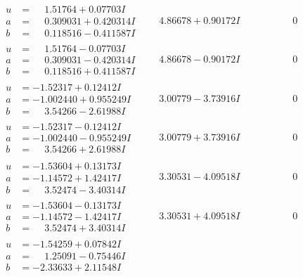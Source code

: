 \documentclass[1p]{elsarticle_modified}
\theoremstyle{definition}
\begin{document}
$$\begin{array}{c|c|c}
\begin{aligned}
u &= \phantom{-}1.51764 + 0.07703 I \\
a &= \phantom{-}0.309031 + 0.420314 I \\
b &= \phantom{-}0.118516 - 0.411587 I\end{aligned}
 & \phantom{-}4.86678 + 0.90172 I & \phantom{-0.000000 } 0 \\ \hline\begin{aligned}
u &= \phantom{-}1.51764 - 0.07703 I \\
a &= \phantom{-}0.309031 - 0.420314 I \\
b &= \phantom{-}0.118516 + 0.411587 I\end{aligned}
 & \phantom{-}4.86678 - 0.90172 I & \phantom{-0.000000 } 0 \\ \hline\begin{aligned}
u &= -1.52317 + 0.12412 I \\
a &= -1.002440 + 0.955249 I \\
b &= \phantom{-}3.54266 - 2.61988 I\end{aligned}
 & \phantom{-}3.00779 - 3.73916 I & \phantom{-0.000000 } 0 \\ \hline\begin{aligned}
u &= -1.52317 - 0.12412 I \\
a &= -1.002440 - 0.955249 I \\
b &= \phantom{-}3.54266 + 2.61988 I\end{aligned}
 & \phantom{-}3.00779 + 3.73916 I & \phantom{-0.000000 } 0 \\ \hline\begin{aligned}
u &= -1.53604 + 0.13173 I \\
a &= -1.14572 + 1.42417 I \\
b &= \phantom{-}3.52474 - 3.40314 I\end{aligned}
 & \phantom{-}3.30531 - 4.09518 I & \phantom{-0.000000 } 0 \\ \hline\begin{aligned}
u &= -1.53604 - 0.13173 I \\
a &= -1.14572 - 1.42417 I \\
b &= \phantom{-}3.52474 + 3.40314 I\end{aligned}
 & \phantom{-}3.30531 + 4.09518 I & \phantom{-0.000000 } 0 \\ \hline\begin{aligned}
u &= -1.54259 + 0.07842 I \\
a &= \phantom{-}1.25091 - 0.75446 I \\
b &= -2.33633 + 2.11548 I\end{aligned}

\end{array}$$
\end{document}
